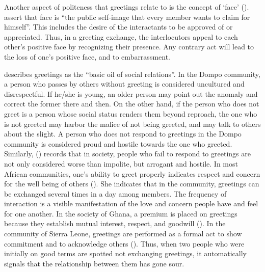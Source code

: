 \documentclass[output=paper,colorlinks,citecolor=brown]{langscibook}
\begin{document}
Another aspect of politeness that greetings relate to is the concept of  ‘face' (\cite{Goffman1967}). \citet[311]{BrownandLevinson1987} assert that face is “the public self-image that every member wants to claim for himself”. This includes the desire of the interactants to be approved of or appreciated. Thus, in a greeting exchange, the interlocutors appeal to each other’s positive face by recognizing their presence. Any contrary act will lead to the loss of one’s positive face, and to embarrassment.

\citet[20]{Spolsky1998} describes greetings as the “basic oil of social relations”. In the Dompo community, a person who passes by others without greeting is considered uncultured and disrespectful. If he/she is young, an older person may point out the anomaly and correct the former there and then. On the other hand, if the person who does not greet is a person whose social status renders them beyond reproach, the one who is not greeted may harbor the malice of not being greeted, and may talk to others about the slight. A person who does not respond to greetings in the Dompo community is considered proud and hostile towards the one who greeted. Similarly, (\cite[301]{Moradi2017}) records that in  society, people who fail to respond to greetings are not only considered worse than impolite, but arrogant and hostile. In most African communities, one’s ability to greet properly indicates respect and concern for the well being of others (\cite[335]{Schleicher1997}). She indicates that in the  community, greetings can be exchanged several times in a day among members. The frequency of interaction is a visible manifestation of the love and concern people have and feel for one another. In the  society of Ghana, a premium is placed on greetings because they establish mutual interest, respect, and goodwill (\cite[384]{Dzameshie2002}). In the  community of Sierra Leone, greetings are performed as a formal act to show commitment and to acknowledge others (\cite[544]{Finnegan1969}). Thus, when two people who were initially on good terms are spotted not exchanging greetings, it automatically signals that the relationship between them has gone sour. 
\end{document}

